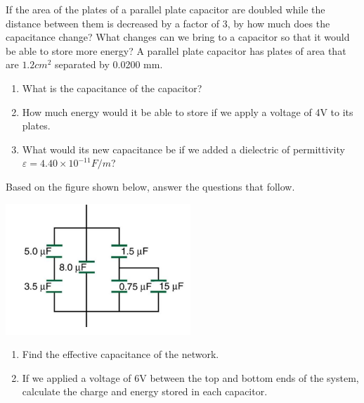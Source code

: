\documentclass[12pt,addpoints]{exam}
\begin{document}
\begin{questions}
		\question If the area of the plates of a parallel plate capacitor are doubled while the distance between them is decreased by a factor of 3, by how much does the capacitance change?\vspace{1.5in}
		\question What changes can we bring to a capacitor so that it would be able to store more energy?\vspace{1.5in}
		\question A parallel plate capacitor has plates of area that are $1.2cm^2$ separated by 0.0200 mm.
		\begin{enumerate}[label=(\roman*)]
			\item What is the capacitance of the capacitor?\vspace{1.5in}
			\item How much energy would it be able to store if we apply a voltage of 4V to its plates.\vspace{1.5in}
			\item What would its new capacitance be if we added a dielectric of permittivity $\varepsilon=4.40\times10^{-11}F/m$? \vspace{1.5in}
		\end{enumerate}
		\question Based on the figure shown below, answer the questions that follow.
		\begin{center}
			\includegraphics[scale=0.8]{cap}
		\end{center}
		\begin{enumerate}[label=(\roman*)]
			\item Find the effective capacitance of the network.\vspace{2.5in}
			\item If we applied a voltage of 6V between the top and bottom ends of the system, calculate the charge and energy stored in each capacitor.\vspace{3.5in}
		\end{enumerate}\newpage

\end{questions}
\end{document}
